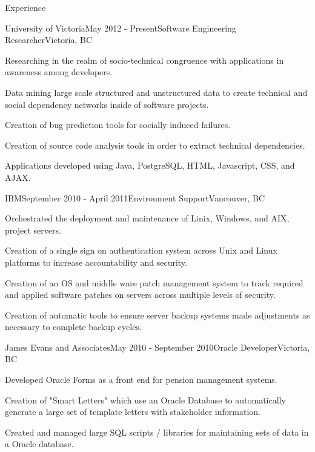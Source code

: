 \documentclass{resume} %
\begin{document}
\begin{rSection}{Experience}

\begin{rSubsection}{University of Victoria}{May 2012 - Present}{Software Engineering Researcher}{Victoria, BC}
\item Researching in the realm of socio-technical congruence with applications in awareness among developers.
\item Data mining large scale structured and unstructured data to create technical and social dependency networks
inside of software projects.
\item Creation of bug prediction tools for socially induced failures.
\item Creation of source code analysis tools in order to extract technical dependencies.
\item Applications developed using Java, PostgreSQL, HTML, Javascript, CSS, and AJAX.
\end{rSubsection}


\begin{rSubsection}{IBM}{September 2010 - April 2011}{Environment Support}{Vancouver, BC}
\item Orchestrated the deployment and maintenance of Linix, Windows, and AIX, project servers.
\item Creation of a single sign on authentication system across Unix and Linux platforms to increase accountability and security.
\item Creation of an OS and middle ware patch management system to track required and applied software patches on servers across multiple levels of security.
\item Creation of automatic tools to ensure server backup systems made adjustments as necessary to complete backup cycles.
\end{rSubsection}


\begin{rSubsection}{James Evans and Associates}{May 2010 - September 2010}{Oracle Developer}{Victoria, BC}
\item Developed Oracle Forms as a front end for pension management systems.
\item Creation of "Smart Letters" which use an Oracle Database to automatically generate a large set of template letters with stakeholder information.
\item Created and managed large SQL scripts / libraries for maintaining sets of data in a Oracle database.
\end{rSubsection}

\end{rSection}
\end{document}

